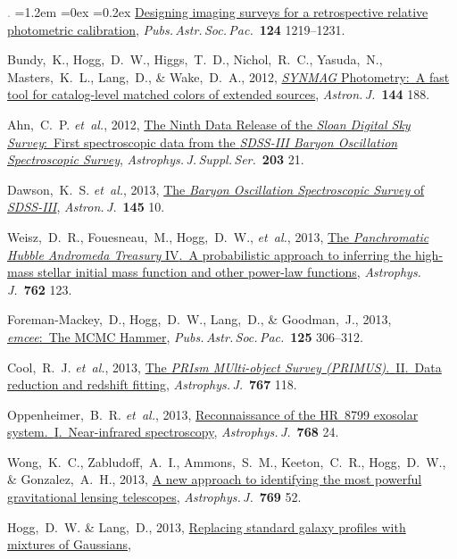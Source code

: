 \documentclass[10pt,letterpaper]{article}
\newcommand{\acronym}[1]{{\small{#1}}}
\newcommand{\foreign}[1]{\textsl{#1}}
\newcommand{\etal}{\foreign{et~al.}}
\newcommand{\project}[1]{\textsl{#1}}
\newcommand{\doi}[2]{\href{http://dx.doi.org/#1}{{#2}}}
\newcommand{\deemph}[1]{\textcolor{grey}{\footnotesize{#1}}}
\newcommand{\pubnumber}[1]{\deemph{{#1}.}}
\newcounter{refpubnum}
\newcommand{\hogglist}{%
    \rightmargin=0in
    \leftmargin=1.2em
    \topsep=0ex
    \partopsep=0pt
    \itemsep=0.2ex
    \parsep=0pt
    \itemindent=-1.0\leftmargin
    \listparindent=0.0\leftmargin
    \settowidth{\labelsep}{~}
    \usecounter{refpubnum}
  }
\begin{document}
\begin{list}{\pubnumber{\therefpubnum}}{\hogglist}
\doi{10.1086/668656}{Designing imaging surveys for a retrospective relative photometric calibration},
\textit{Pubs.\,Astr.\,Soc.\,Pac.}\ \textbf{124} 1219--1231.
\item
Bundy,~K., Hogg,~D.~W., Higgs,~T.~D., Nichol,~R.~C., Yasuda,~N., Masters,~K.~L., Lang,~D.,
\& Wake,~D.~A., 2012,
\doi{10.1088/0004-6256/144/6/188}{\project{SYNMAG} Photometry:\ A fast tool for catalog-level matched colors of extended sources},
\textit{Astron.\,J.}\ \textbf{144} 188.
\item
Ahn,~C.~P. \etal, 2012,
\doi{10.1088/0067-0049/203/2/21}{The Ninth Data Release of the \project{Sloan Digital Sky Survey}:\ First spectroscopic data from the \project{\acronym{SDSS-III} Baryon Oscillation Spectroscopic Survey}},
\textit{Astrophys.\,J.\,Suppl.\,Ser.}\ \textbf{203} 21.
\item
Dawson,~K.~S. \etal, 2013,
\doi{10.1088/0004-6256/145/1/10}{The \project{Baryon Oscillation Spectroscopic Survey} of \project{\acronym{SDSS-III}}},
\textit{Astron.\,J.}\ \textbf{145} 10.
\item
Weisz,~D.~R., Fouesneau,~M., Hogg,~D.~W., \etal, 2013,
\doi{10.1088/0004-637X/762/2/123}{The \project{Panchromatic Hubble Andromeda Treasury} \acronym{IV}.\ A probabilistic approach to inferring the high-mass stellar initial mass function and other power-law functions},
\textit{Astrophys.\,J.}\ \textbf{762} 123.
\item
Foreman-Mackey,~D., Hogg,~D.~W., Lang,~D., \& Goodman,~J., 2013,
\doi{10.1086/670067}{\project{emcee}:\ The MCMC Hammer},
\textit{Pubs.\,Astr.\,Soc.\,Pac.}\ \textbf{125} 306--312.
\item
Cool,~R.~J. \etal, 2013,
\doi{10.1088/0004-637X/767/2/118}{The \project{PRIsm MUlti-object Survey (\acronym{PRIMUS})}.\ \acronym{II}.\ Data reduction and redshift fitting},
\textit{Astrophys.\,J.}\ \textbf{767} 118.
\item
Oppenheimer,~B.~R. \etal, 2013,
\doi{10.1088/0004-637X/768/1/24}{Reconnaissance of the HR~8799 exosolar system.\ \acronym{I}.\ Near-infrared spectroscopy},
\textit{Astrophys.\,J.}\ \textbf{768} 24.
\item
Wong,~K.~C., Zabludoff,~A.~I., Ammons,~S.~M., Keeton,~C.~R., Hogg,~D.~W., \& Gonzalez,~A.~H., 2013,
\doi{10.1088/0004-637X/769/1/52}{A new approach to identifying the most powerful gravitational lensing telescopes},
\textit{Astrophys.\,J.}\ \textbf{769} 52.
\item
Hogg,~D.~W. \& Lang,~D., 2013,
\doi{10.1086/671228}{Replacing standard galaxy profiles with mixtures of Gaussians},

\end{list}
\end{document}
